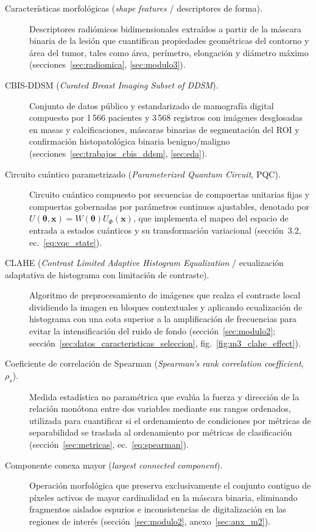 \begin{description}
  \item[Características morfológicas (\textit{shape features} / descriptores de forma).] Descriptores radiómicos bidimensionales extraídos a partir de la máscara binaria de la lesión que cuantifican propiedades geométricas del contorno y área del tumor, tales como área, perímetro, elongación y diámetro máximo (secciones~\ref{sec:radiomica}, \ref{sec:modulo3}).

  \item[CBIS-DDSM (\textit{Curated Breast Imaging Subset of DDSM}).] Conjunto de datos público y estandarizado de mamografía digital compuesto por 1\,566 pacientes y 3\,568 registros con imágenes desglosadas en masas y calcificaciones, máscaras binarias de segmentación del ROI y confirmación histopatológica binaria benigno/maligno (secciones~\ref{sec:trabajos_cbis_ddsm}, \ref{sec:eda}).

  \item[Circuito cuántico parametrizado (\textit{Parameterized Quantum Circuit}, PQC).] Circuito cuántico compuesto por secuencias de compuertas unitarias fijas y compuertas gobernadas por parámetros continuos ajustables, denotado por $U(\boldsymbol{\theta}, \mathbf{x}) = W(\boldsymbol{\theta})U_\Phi(\mathbf{x})$, que implementa el mapeo del espacio de entrada a estados cuánticos y su transformación variacional (sección~3.2, ec.~\ref{eq:vqc_state}).

  \item[CLAHE (\textit{Contrast Limited Adaptive Histogram Equalization} / ecualización adaptativa de histograma con limitación de contraste).] Algoritmo de preprocesamiento de imágenes que realza el contraste local dividiendo la imagen en bloques contextuales y aplicando ecualización de histograma con una cota superior a la amplificación de frecuencias para evitar la intensificación del ruido de fondo (sección~\ref{sec:modulo2}; sección~\ref{sec:datos_caracteristicas_seleccion}, fig.~\ref{fig:m3_clahe_effect}).

  \item[Coeficiente de correlación de Spearman (\textit{Spearman's rank correlation coefficient}, $\rho_s$).] Medida estadística no paramétrica que evalúa la fuerza y dirección de la relación monótona entre dos variables mediante sus rangos ordenados, utilizada para cuantificar si el ordenamiento de condiciones por métricas de separabilidad se traslada al ordenamiento por métricas de clasificación (sección~\ref{sec:metricas}, ec.~\ref{eq:spearman}).

  \item[Componente conexa mayor (\textit{largest connected component}).] Operación morfológica que preserva exclusivamente el conjunto contiguo de píxeles activos de mayor cardinalidad en la máscara binaria, eliminando fragmentos aislados espurios e inconsistencias de digitalización en las regiones de interés (sección~\ref{sec:modulo2}, anexo~\ref{sec:anx_m2}).


\end{description}
